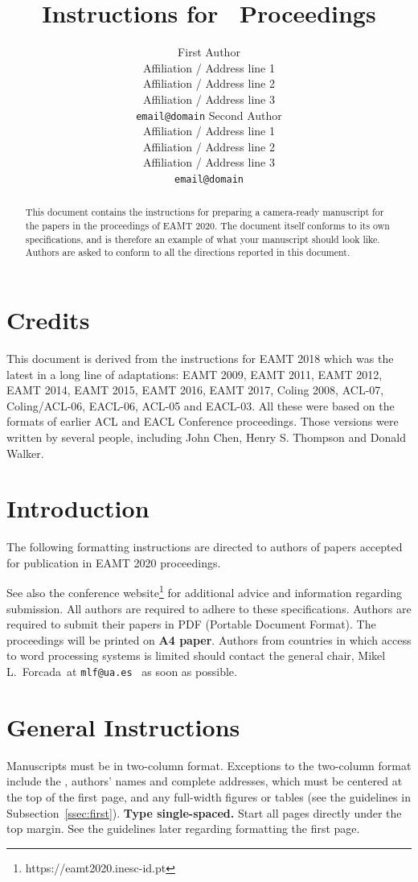 \documentclass[11pt]{article}
\title{Instructions for \confname\ Proceedings}
\author{First Author\\
  Affiliation / Address line 1\\
  Affiliation / Address line 2\\
  Affiliation / Address line 3\\
  {\tt email@domain}  \And
  Second Author\\
  Affiliation / Address line 1\\
  Affiliation / Address line 2\\
  Affiliation / Address line 3\\
  {\tt email@domain}}
\date{}
\makeatletter
\newcommand{\confname}{EAMT 2020}
\newcommand{\urlwebsite}{https://eamt2020.inesc-id.pt}
\newcommand{\contactname}{the general chair, Mikel L.\ Forcada}
\newcommand{\contactemail}{\texttt{mlf@ua.es}}
\makeatother
\begin{document}
\maketitle
\begin{abstract}
  This document contains the instructions for preparing a camera-ready
  manuscript for the papers in the
  proceedings of \confname . The document itself
  conforms to its own specifications, and is therefore an example of
  what your manuscript should look like. Authors are asked to conform
  to all the directions reported in this document.
\end{abstract}

\section{Credits}

This document is derived from the instructions for EAMT 2018 %
which was the latest in a long line of adaptations: EAMT 2009, EAMT 2011, EAMT 2012, EAMT 2014, EAMT 2015, EAMT 2016, EAMT 2017, Coling 2008, ACL-07, Coling/ACL-06, EACL-06, ACL-05 and EACL-03.  All these were based on the formats of earlier ACL and EACL Conference proceedings.  Those versions were written by several people, including John
Chen, Henry S. Thompson and Donald Walker.

\section{Introduction}

The following formatting instructions are directed to authors of
papers accepted for publication in \confname{} proceedings.

See also the
conference website\footnote{\urlwebsite} for additional
advice and information regarding submission.  All authors are required to adhere to these
specifications. Authors are required to submit their papers in PDF  (Portable Document
Format). The proceedings will be printed on
{\bf A4 paper}. Authors from countries in which access to
word processing systems is limited should contact \contactname~at \contactemail~ as soon as possible.

\section{General Instructions}

Manuscripts must be in two-column format.  Exceptions to the
two-column format include the {}, authors' names and complete
addresses, which must be centered at the top of the first page, and
any full-width figures or tables (see the guidelines in
Subsection~\ref{ssec:first}). {\bf Type single-spaced.}  Start all
pages directly under the top margin. See the guidelines later
regarding formatting the first page.
\end{document}
